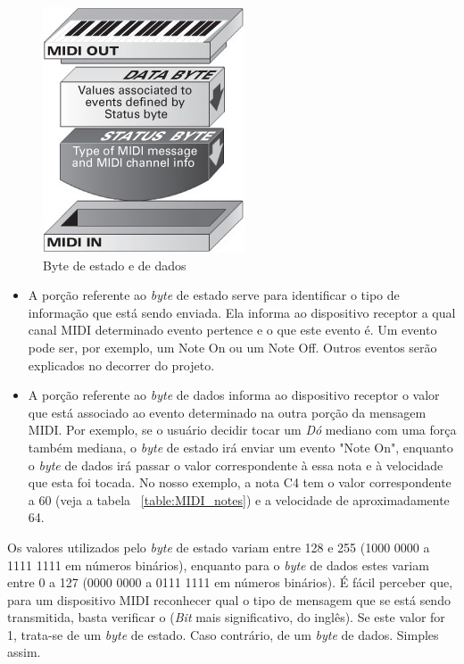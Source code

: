             \begin{figure}[H]
            	\centering
            	\includegraphics[scale=0.8]{Imagens/Status_and_Data_Bytes.jpg}
            	\caption[Byte de estado e de dados]{Byte de estado e de dados ~\cite{Guerin}}
            	\label{fig:Status_and_Data_Bytes}
            \end{figure}

            \begin{itemize}
                \item A porção referente ao \textit{byte} de estado serve para identificar o tipo de informação que está sendo enviada. Ela informa ao dispositivo receptor a qual canal MIDI determinado evento pertence e o que este evento é. Um evento pode ser, por exemplo, um Note On ou um Note Off. Outros eventos serão explicados no decorrer do projeto.

                \item A porção referente ao \textit{byte} de dados informa ao dispositivo receptor o valor que está associado ao evento determinado na outra porção da mensagem MIDI. Por exemplo, se o usuário decidir tocar um \textit{Dó} mediano com uma força também mediana, o \textit{byte} de estado irá enviar um evento "Note On", enquanto o \textit{byte} de dados irá passar o valor correspondente à essa nota e à velocidade que esta foi tocada. No nosso exemplo, a nota C4 tem o valor correspondente a 60 (veja a tabela ~\ref{table:MIDI_notes}) e a velocidade de aproximadamente 64.
            \end{itemize}

            Os valores utilizados pelo \textit{byte} de estado variam entre 128 e 255 (1000 0000 a 1111 1111 em números binários), enquanto para o \textit{byte} de dados estes variam entre 0 a 127 (0000 0000 a 0111 1111 em números binários). É fácil perceber que, para um dispositivo MIDI reconhecer qual o tipo de mensagem que se está sendo transmitida, basta verificar o  (\textit{Bit} mais significativo, do inglês). Se este valor for 1, trata-se de um \textit{byte} de estado. Caso contrário, de um \textit{byte} de dados. Simples assim.

